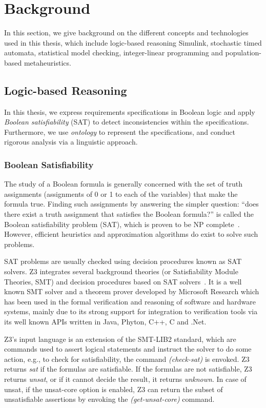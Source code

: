 \chapter{Background}
In this section, we give background on the different concepts and technologies used in this thesis, which include logic-based reasoning Simulink, stochastic timed automata,  statistical model checking, integer-linear programming and population-based metaheuristics.
\section{Logic-based Reasoning}
In this thesis, we express requirements specifications in  Boolean logic and apply \textit{Boolean satisfiability} (SAT) to detect inconsistencies within the specifications. Furthermore, we use \textit{ontology} to represent the specifications, and conduct rigorous analysis via a linguistic approach.
\subsection*{Boolean Satisfiability}
The study of a Boolean formula is generally concerned with the set of truth assignments (assignments of 0 or 1 to each of the variables) that make the formula true. Finding such assignments by answering the simpler question: ``does there exist a truth assignment that satisfies the Boolean formula?'' is called the Boolean satisfiability problem (SAT), which is proven to be NP complete~\cite{devlin2008satisfiability}\cite{Biere2009HandbookSatisfiability}. However, efficient heuristics and approximation algorithms do exist to solve such problems.

SAT problems are usually checked using decision procedures known as SAT solvers. Z3 integrates several background theories (or Satisfiability Module Theories, SMT) and decision procedures based on SAT solvers~\cite{DeMoura2008Z3:Solver}. It is a well known SMT solver and a theorem prover developed by Microsoft Research which has been used in the formal verification and reasoning of software and hardware systems, mainly due to its strong support for integration to verification tools via its well known APIs written in Java, Phyton, C++, C and .Net. 

Z3's input language is an extension of the SMT-LIB2 standard, which are commands used to assert logical statements and instruct the solver to do some action, e.g., to check for satisfiability, the command \textit{(check-sat) }is envoked. Z3 returns \textit{sat} if the formulas are satisfiable. If the formulas are not satisfiable, Z3 returns \textit{unsat}, or if it cannot decide the result, it returns \textit{unknown}. In case of unsat, if the unsat-core option is enabled, Z3 can return the subset of unsatisfiable assertions by envoking the \textit{(get-unsat-core)} command.

